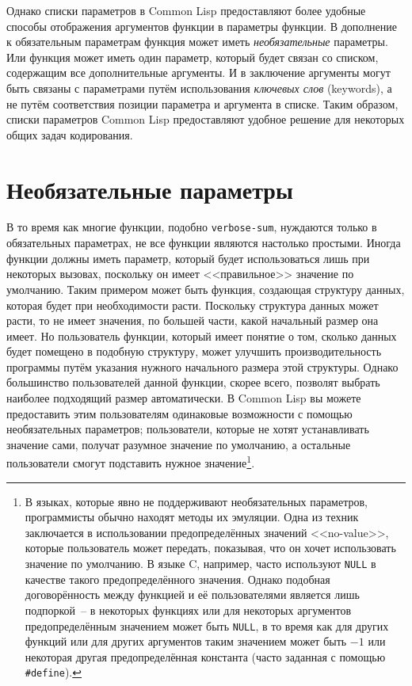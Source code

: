 Однако списки параметров в Common Lisp предоставляют более удобные способы отображения
аргументов функции в параметры функции.  В дополнение к обязательным параметрам функция
может иметь \textit{необязательные} параметры.  Или функция может иметь один параметр,
который будет связан со списком, содержащим все дополнительные аргументы.  И в заключение
аргументы могут быть связаны с параметрами путём использования \textit{ключевых слов}
(keywords), а не путём соответствия позиции параметра и аргумента в списке.  Таким
образом, списки параметров Common Lisp предоставляют удобное решение для некоторых общих
задач кодирования.

\section{Необязательные параметры}

В то время как многие функции, подобно \lstinline{verbose-sum}, нуждаются только в обязательных
параметрах, не все функции являются настолько простыми.  Иногда функции должны иметь
параметр, который будет использоваться лишь при некоторых вызовах, поскольку он имеет
<<правильное>> значение по умолчанию.  Таким примером может быть функция, создающая
структуру данных, которая будет при необходимости расти.  Поскольку структура данных может
расти, то не имеет значения, по большей части, какой начальный размер она имеет.  Но
пользователь функции, который имеет понятие о том, сколько данных будет помещено в
подобную структуру, может улучшить производительность программы путём указания нужного
начального размера этой структуры.  Однако большинство пользователей данной функции,
скорее всего, позволят выбрать наиболее подходящий размер автоматически.  В Common Lisp вы
можете предоставить этим пользователям одинаковые возможности с помощью необязательных
параметров; пользователи, которые не хотят устанавливать значение сами, получат разумное
значение по умолчанию, а остальные пользователи смогут подставить нужное
значение\footnote{В языках, которые явно не поддерживают необязательных параметров,
  программисты обычно находят методы их эмуляции.  Одна из техник заключается в
  использовании предопределённых значений <<no-value>>, которые пользователь может
  передать, показывая, что он хочет использовать значение по умолчанию.  В языке C,
  например, часто используют \lstinline{NULL} в качестве такого предопределённого значения.
  Однако подобная договорённость между функцией и её пользователями является лишь
  подпоркой~-- в некоторых функциях или для некоторых аргументов предопределённым
  значением может быть \lstinline{NULL}, в то время как для других функций или для других
  аргументов таким значением может быть $-1$ или некоторая другая
  предопределённая константа (часто заданная с помощью \lstinline!#define!).}.


